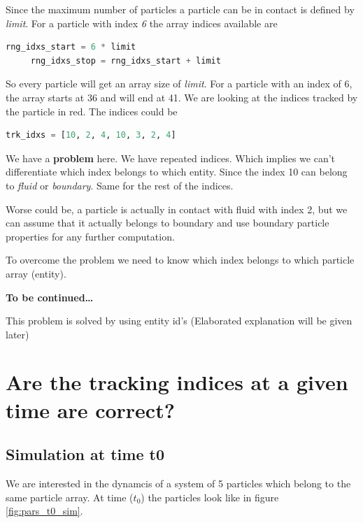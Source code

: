 Since the maximum number of particles a particle can be in contact is defined by \emph{limit}. For a
particle with index \emph{6} the array indices available are

\begin{lstlisting}[language=Python]
     rng_idxs_start = 6 * limit
     rng_idxs_stop = rng_idxs_start + limit
\end{lstlisting}

So every particle will get an array size of \emph{limit}. For a particle with an
index of 6, the array starts at 36 and will end at 41. We are looking at the
indices tracked by the particle in red. The indices could be

\begin{lstlisting}[language=Python]
     trk_idxs = [10, 2, 4, 10, 3, 2, 4]
\end{lstlisting}

We have a \textbf{problem} here. We have repeated indices. Which implies we can't
differentiate which index belongs to which entity. Since the index 10 can
belong to \emph{fluid} or \emph{boundary}.  Same for the rest of the indices.

Worse could be, a particle is actually in contact with fluid with index 2,
but we can assume that it actually belongs to boundary and use boundary
particle properties for any further computation.

To overcome the problem we need to know which index belongs to which particle
array (entity).

\textbf{To be continued\ldots{}}

This problem is solved by using entity id's (Elaborated explanation will be
given later)



\section{Are the tracking indices at a given time are correct?}
\label{sec-4}

\subsection{Simulation at time t0}
\label{sec-4-1}
We are interested in the dynamcis of a system of 5 particles which belong to
the same particle array. At time ($t_0$) the particles look like in figure
\ref{fig:pars_t0_sim}.

